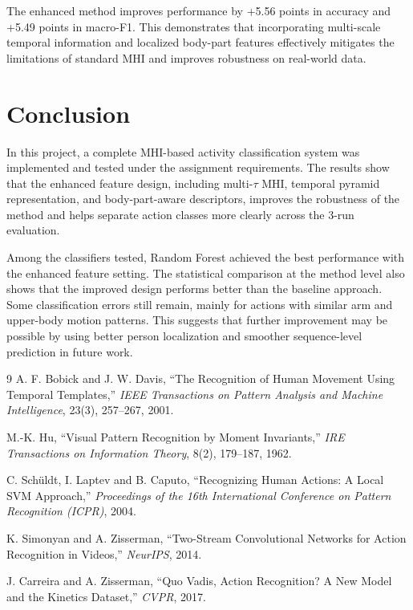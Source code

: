 \documentclass[11pt]{article}
\begin{document}
The enhanced method improves performance by +5.56 points in accuracy and +5.49 points in macro-F1. This demonstrates that incorporating multi-scale temporal information and localized body-part features effectively mitigates the limitations of standard MHI and improves robustness on real-world data.


\section{Conclusion}
In this project, a complete MHI-based activity classification system was implemented and tested under the assignment requirements. The results show that the enhanced feature design, including multi-$\tau$ MHI, temporal pyramid representation, and body-part-aware descriptors, improves the robustness of the method and helps separate action classes more clearly across the 3-run evaluation.

Among the classifiers tested, Random Forest achieved the best performance with the enhanced feature setting. The statistical comparison at the method level also shows that the improved design performs better than the baseline approach. Some classification errors still remain, mainly for actions with similar arm and upper-body motion patterns. This suggests that further improvement may be possible by using better person localization and smoother sequence-level prediction in future work.

\begin{thebibliography}{9}
A. F. Bobick and J. W. Davis,
``The Recognition of Human Movement Using Temporal Templates,''
\emph{IEEE Transactions on Pattern Analysis and Machine Intelligence}, 23(3), 257--267, 2001.

M.-K. Hu,
``Visual Pattern Recognition by Moment Invariants,''
\emph{IRE Transactions on Information Theory}, 8(2), 179--187, 1962.


C. Sch\"uldt, I. Laptev and B. Caputo,
``Recognizing Human Actions: A Local SVM Approach,''
\emph{Proceedings of the 16th International Conference on Pattern Recognition (ICPR)}, 2004.

K. Simonyan and A. Zisserman,
``Two-Stream Convolutional Networks for Action Recognition in Videos,''
\emph{NeurIPS}, 2014.

J. Carreira and A. Zisserman,
``Quo Vadis, Action Recognition? A New Model and the Kinetics Dataset,''
\emph{CVPR}, 2017.
\end{thebibliography}
\end{document}
